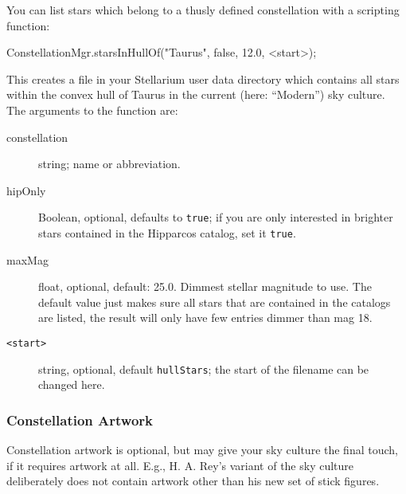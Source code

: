You can list stars which belong to a thusly defined constellation with a scripting function:
\begin{script}
ConstellationMgr.starsInHullOf("Taurus", false, 12.0, <start>);
\end{script}
This creates a file  in your Stellarium user data directory which contains all stars within the convex hull of Taurus in the current (here: ``Modern'') sky culture. 
The arguments to the function are:
\begin{description}
\item[constellation] string; name or abbreviation.
\item[hipOnly] Boolean, optional, defaults to \texttt{true}; if you are only interested in brighter stars contained in the Hipparcos catalog, set it \texttt{true}. 
\item[maxMag] float, optional, default: 25.0. Dimmest stellar magnitude to use. The default value just makes sure all stars that are contained in the catalogs are listed, 
              the result will only have few entries dimmer than mag 18.
\item[\texttt{<start>}] string, optional, default \texttt{hullStars}; the start of the filename can be changed here. 
\end{description}

\subsubsection{Constellation Artwork}
\label{sec:skycultures:artwork}
\label{SC:image}

Constellation artwork is optional, but may give your sky culture the
final touch, if it requires artwork at all. E.g., H. A. Rey's variant
of the  sky culture deliberately does not contain artwork
other than his new set of stick figures.

